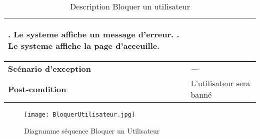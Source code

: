 \begin{center}
\begin{table}[H]
{\begin{tabular}{ | l | m{0.51\textheight}|}
{\begin{enumerate}
						\subitem 7. Le systeme affiche un message d'erreur.
						\subitem 8. Le systeme affiche la page d'acceuille.
				\end{enumerate}}\\
				\hline
				\cellcolor[HTML]{99ccff} \textbf{Scénario d'exception} & --- \\
				\hline
				\cellcolor[HTML]{99ccff} \textbf{Post-condition} & L'utilisateur sera banné\\
				\hline
		\end{tabular}}
		\caption{Description Bloquer un utilisateur}
		\label{table:bloquer utilisateur}
	\end{table}
	\begin{figure}[H]
		\centering
		\texttt{[image: BloquerUtilisateur.jpg]}
		\caption{Diagramme séquence Bloquer un Utilisateur}
		\label{fig:seq bloquer utilisateur}
	\end{figure}
\end{center}


